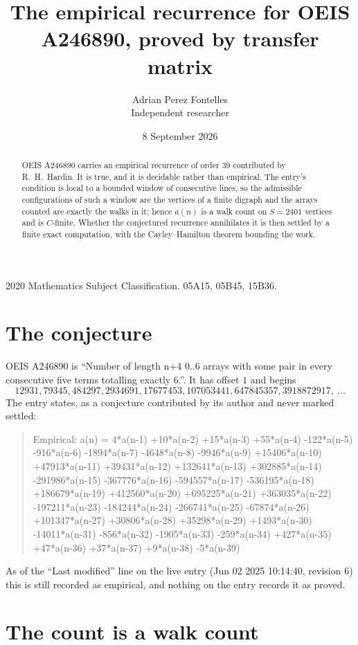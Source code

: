 \documentclass[11pt,a4paper]{article}
\title{The empirical recurrence for OEIS A246890, proved by transfer matrix}
\author{Adrian Perez Fontelles\\ \small Independent researcher}
\date{8 September 2026}
\theoremstyle{plain}
\theoremstyle{definition}
\begin{document}
\maketitle

\begin{abstract}
OEIS A246890 carries an empirical recurrence of order $39$ contributed by R.~H.~Hardin. It is
true, and it is decidable rather than empirical. The entry's condition is local to a bounded window of consecutive lines, so
the admissible configurations of such a window are the vertices of a finite digraph and the
arrays counted are exactly the walks in it; hence $a(n)$ is a walk count on $S=2401$ vertices
and is $C$-finite. Whether the conjectured recurrence annihilates it is then settled by a
finite exact computation, with the Cayley--Hamilton theorem bounding the work.
\end{abstract}

\noindent\small 2020 Mathematics Subject Classification. 05A15, 05B45, 15B36.\normalsize

\section{The conjecture}

OEIS A246890 is ``Number of length n+4 0..6 arrays with some pair in every consecutive five terms totalling exactly 6.''. It has offset $1$ and begins
\[
12931, 79345, 484297, 2934691, 17677453, 107053441, 647845357, 3918872917,\ \dots
\]
The entry states, as a conjecture contributed by its author and never marked settled:
\begin{quote}
Empirical: a(n) = 4*a(n-1) +10*a(n-2) +15*a(n-3) +55*a(n-4) -122*a(n-5) -916*a(n-6) -1894*a(n-7) -4648*a(n-8) -9946*a(n-9) +15406*a(n-10) +47913*a(n-11) +39431*a(n-12) +132641*a(n-13) +302885*a(n-14) -291986*a(n-15) -367776*a(n-16) -594557*a(n-17) -536195*a(n-18) +186679*a(n-19) +412560*a(n-20) +695225*a(n-21) +363035*a(n-22) -197211*a(n-23) -184244*a(n-24) -266741*a(n-25) -67874*a(n-26) +101347*a(n-27) +30806*a(n-28) +35298*a(n-29) +1493*a(n-30) -14011*a(n-31) -856*a(n-32) -1905*a(n-33) -259*a(n-34) +427*a(n-35) +47*a(n-36) +37*a(n-37) +9*a(n-38) -5*a(n-39)
\end{quote}
As of the ``Last modified'' line on the live entry (Jun 02 2025 10:14:40, revision 6) this is still
recorded as empirical, and nothing on the entry records it as proved.

\section{The count is a walk count}
\end{document}
